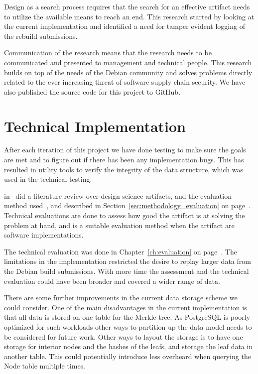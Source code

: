 \documentclass[../Main/thesis.tex]{subfiles}
\begin{document}
Design as a search process requires that the search for an effective artifact
needs to utilize the available means to reach an end. This research started by
looking at the current implementation and identified a need for tamper evident
logging of the rebuild submissions.

Communication of the research means that the research needs to be communicated
and presented to management and technical people. This research builds on top of
the needs of the Debian community and solves problems directly related to the
ever increasing threat of software supply chain security. We have also published
the source code for this project to GitHub.

\section{Technical Implementation}%
\label{sec:technical_Implementation}
After each iteration of this project we have done testing to make sure the goals
are met and to figure out if there has been any implementation bugs. This has
resulted in utility tools to verify the integrity of the data structure, which
was used in the technical testing.

\citeauthor{Peffers:2012:DSR:2342209.2342243}
in~ did a literature review over
design science artifacts, and the evaluation method
used~\cite{Peffers:2012:DSR:2342209.2342243}, and described in
Section~\ref{sec:methodology_evaluation} on
page~\pageref{sec:methodology_evaluation}. Technical evaluations are done to
assess how good the artifact is at solving the problem at hand, and is a
suitable evaluation method when the artifact are software implementations.

The technical evaluation was done in Chapter~\ref{ch:evaluation} on
page~\pageref{ch:evaluation}. The limitations in the implementation restricted
the desire to replay larger data from the Debian build submissions. With more
time the assessment and the technical evaluation could have been broader and
covered a wider range of data.

There are some further improvements in the current data storage scheme we could
consider. One of the main disadvantages in the current implementation is that
all data is stored on one table for the Merkle tree. As PostgreSQL is poorly
optimized for such workloads other ways to partition up the data model needs to
be considered for future work. Other ways to layout the storage is to have one
storage for interior nodes and the hashes of the leafs, and storage the leaf
data in another table. This could potentially introduce less overheard when
querying the Node table multiple times.
\end{document}
